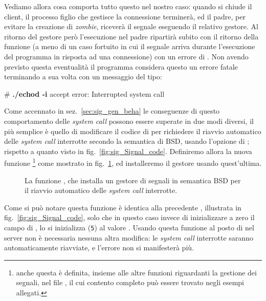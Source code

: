Vediamo allora cosa comporta tutto questo nel nostro caso: quando si chiude il
client, il processo figlio che gestisce la connessione terminerà, ed il padre,
per evitare la creazione di \textit{zombie}, riceverà il segnale
 eseguendo il relativo gestore. Al ritorno del gestore però
l'esecuzione nel padre ripartirà subito con il ritorno della funzione
 (a meno di un caso fortuito in cui il segnale arriva durante
l'esecuzione del programma in risposta ad una connessione) con un errore di
. Non avendo previsto questa eventualità il programma considera
questo un errore fatale terminando a sua volta con un messaggio del tipo:
\begin{Console}
# \textbf{./echod -i}
accept error: Interrupted system call
\end{Console}

Come accennato in sez.~\ref{sec:sig_gen_beha} le conseguenze di questo
comportamento delle \textit{system call} possono essere superate in due modi
diversi, il più semplice è quello di modificare il codice di  per
richiedere il riavvio automatico delle \textit{system call} interrotte secondo
la semantica di BSD, usando l'opzione  di ;
rispetto a quanto visto in fig.~\ref{fig:sig_Signal_code}. Definiremo allora
la nuova funzione \footnote{anche questa è definita,
  insieme alle altre funzioni riguardanti la gestione dei segnali, nel file
  , il cui contento completo può essere trovato negli esempi
  allegati.} come mostrato in fig.~\ref{fig:sig_SignalRestart_code}, ed
installeremo il gestore usando quest'ultima.

\begin{figure}[!htbp]
  \footnotesize \centering
  \begin{minipage}[c]{\codesamplewidth}
  \end{minipage}  
  \normalsize 
  \caption{La funzione , che installa un gestore di
    segnali in semantica BSD per il riavvio automatico delle \textit{system
      call} interrotte.}
  \label{fig:sig_SignalRestart_code}
\end{figure}

Come si può notare questa funzione è identica alla precedente ,
illustrata in fig.~\ref{fig:sig_Signal_code}, solo che in questo caso invece
di inizializzare a zero il campo  di , lo si
inizializza (\texttt{\small 5}) al valore . Usando questa
funzione al posto di  nel server non è necessaria nessuna altra
modifica: le \textit{system call} interrotte saranno automaticamente
riavviate, e l'errore  non si manifesterà più.

